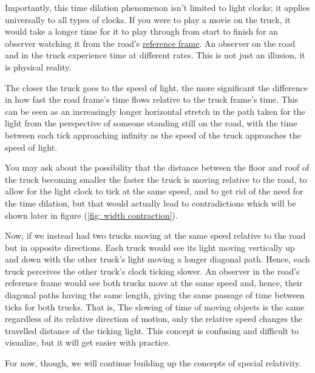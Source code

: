 Importantly, this time dilation phenomenon isn't limited to light clocks; it applies universally to all types of clocks.
If you were to play a movie on the truck, it would take a longer time for it to play through from start to finish for an observer watching it from the road's \hyperlink{def-Reference-frame}{reference frame}.
An observer on the road and in the truck experience time at different rates.
This is not just an illusion, it is physical reality.

The closer the truck goes to the speed of light, the more significant the difference in how fast the road frame's time flows relative to the truck frame's time.
This can be seen as an increasingly longer horizontal stretch in the path taken for the light from the perspective of someone standing still on the road, with the time between each tick approaching infinity as the speed of the truck approaches the speed of light.

You may ask about the possibility that the distance between the floor and roof of the truck becoming smaller the faster the truck is moving relative to the road, to allow for the light clock to tick at the same speed, and to get rid of the need for the time dilation, but that would actually lead to contradictions which will be shown later in figure (\ref{fig: width contraction}).

Now, if we instead had two trucks moving at the same speed relative to the road but in opposite directions.
Each truck would see its light moving vertically up and down with the other truck's light moving a longer diagonal path.
Hence, each truck perceives the other truck's clock ticking slower.
An observer in the road's reference frame would see both trucks move at the same speed and, hence, their diagonal paths having the same length, giving the same passage of time between ticks for both trucks.
That is, The slowing of time of moving objects is the same regardless of its relative direction of motion, only the relative speed changes the travelled distance of the ticking light.
This concept is confusing and difficult to visualize, but it will get easier with practice.


For now, though, we will continue building up the concepts of special relativity.


